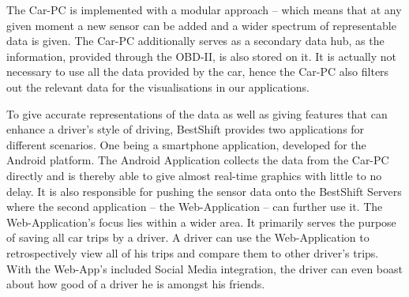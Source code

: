 The Car-PC is implemented with a modular approach – which means that at any given moment a new sensor can be added and a wider spectrum of representable data is given. The Car-PC additionally serves as a secondary data hub, as the information, provided through the OBD-II, is also stored on it. It is actually not necessary to use all the data provided by the car, hence the Car-PC also filters out the relevant data for the visualisations in our applications.

To give accurate representations of the data as well as giving features that can enhance a driver’s style of driving, BestShift provides two applications for different scenarios. One being a smartphone application, developed for the Android platform. The Android Application collects the data from the Car-PC directly and is thereby able to give almost real-time graphics with little to no delay. It is also responsible for pushing the sensor data onto the BestShift Servers where the second application – the Web-Application – can further use it. The Web-Application’s focus lies within a wider area. It primarily serves the purpose of saving all car trips by a driver. A driver can use the Web-Application to retrospectively view all of his trips and compare them to other driver’s trips. With the Web-App’s included Social Media integration, the driver can even boast about how good of a driver he is amongst his friends.
